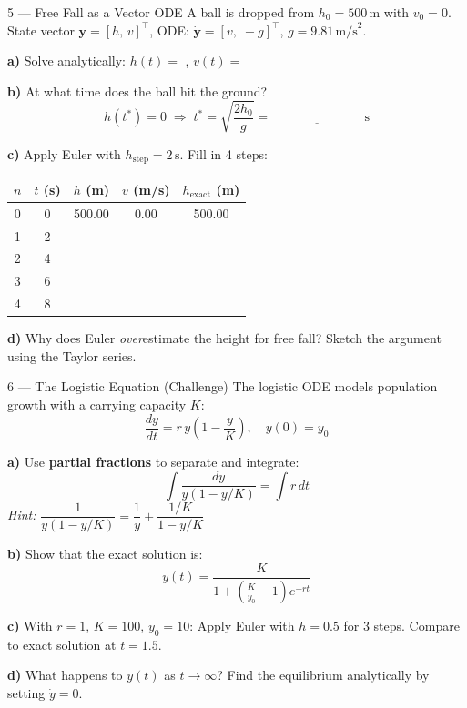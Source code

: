 \documentclass[12pt, a4paper]{article}
\begin{document}
\begin{solutionspace}[6cm]
\end{solutionspace}

\begin{exercisebox}{5 — Free Fall as a Vector ODE}
A ball is dropped from $h_0 = 500\,\text{m}$ with $v_0 = 0$.
State vector $\mathbf{y} = [h,\, v]^\top$, ODE: $\dot{\mathbf{y}} = [v,\; -g]^\top$, $g=9.81\,\text{m/s}^2$.

\textbf{a)} Solve analytically: $h(t) = $ \underline{\hspace{4cm}}, \quad $v(t) = $ \underline{\hspace{4cm}}

\textbf{b)} At what time does the ball hit the ground?
\[
  h(t^*) = 0 \;\Rightarrow\; t^* = \sqrt{\frac{2h_0}{g}} = \underline{\hspace{3cm}}\,\text{s}
\]

\textbf{c)} Apply Euler with $h_\text{step} = 2\,\text{s}$. Fill in 4 steps:

\begin{center}
\begin{tabular}{|c|c|c|c|c|}
\hline
$n$ & $t$ (s) & $h$ (m) & $v$ (m/s) & $h_\text{exact}$ (m) \\
\hline
0 & 0  & 500.00 & 0.00   & 500.00 \\
\hline
1 & 2  & & & \\
\hline
2 & 4  & & & \\
\hline
3 & 6  & & & \\
\hline
4 & 8  & & & \\
\hline
\end{tabular}
\end{center}

\textbf{d)} Why does Euler \textit{over}estimate the height for free fall? Sketch the argument using the Taylor series.
\end{exercisebox}

\begin{solutionspace}[8cm]
\end{solutionspace}

\begin{exercisebox}{6 — The Logistic Equation (Challenge)}
The logistic ODE models population growth with a carrying capacity $K$:
\[
  \frac{dy}{dt} = r\,y\left(1 - \frac{y}{K}\right), \quad y(0) = y_0
\]

\textbf{a)} Use \textbf{partial fractions} to separate and integrate:
\[
  \int \frac{dy}{y(1 - y/K)} = \int r\,dt
\]
\textit{Hint:} $\dfrac{1}{y(1-y/K)} = \dfrac{1}{y} + \dfrac{1/K}{1-y/K}$

\textbf{b)} Show that the exact solution is:
\[
  y(t) = \frac{K}{1 + \left(\frac{K}{y_0}-1\right)e^{-rt}}
\]

\textbf{c)} With $r=1$, $K=100$, $y_0=10$: Apply Euler with $h=0.5$ for 3 steps.
Compare to exact solution at $t=1.5$.

\textbf{d)} What happens to $y(t)$ as $t\to\infty$? Find the equilibrium analytically by setting $\dot{y}=0$.
\end{exercisebox}
\end{document}
